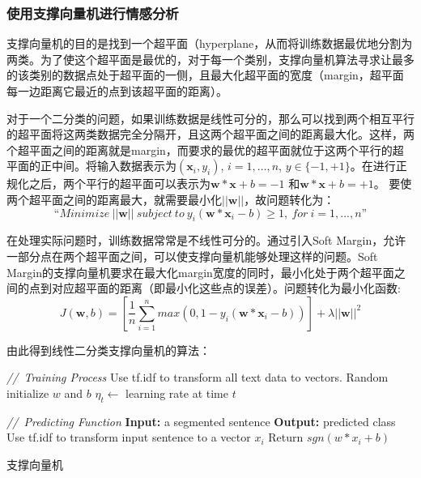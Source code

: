 \subsubsection{使用支撑向量机进行情感分析}
支撑向量机的目的是找到一个超平面（hyperplane，从而将训练数据最优地分割为两类。为了使这个超平面是最优的，对于每一个类别，支撑向量机算法寻求让最多的该类别的数据点处于超平面的一侧，且最大化超平面的宽度（margin，超平面每一边距离它最近的点到该超平面的距离）。

对于一个二分类的问题，如果训练数据是线性可分的，那么可以找到两个相互平行的超平面将这两类数据完全分隔开，且这两个超平面之间的距离最大化。这样，两个超平面之间的距离就是margin，而要求的最优的超平面就位于这两个平行的超平面的正中间。将输入数据表示为$(\textbf{x}_i, y_i)$, $i=1,..., n$, $y \in \{-1,+1\}$。在进行正规化之后，两个平行的超平面可以表示为$\textbf{w}*\textbf{x}+b=-1$ 和$\textbf{w}*\textbf{x}+b=+1$。 要使两个超平面之间的距离最大，就需要最小化$||\textbf{w}||$，故问题转化为：
\begin{equation} \label{eq2.2}
“Minimize\ ||\textbf{w}||\ subject\ to\ y_i(\textbf{w}*\textbf{x}_i-b)\ge 1,\ for\ i=1,...,n”
\end{equation}

在处理实际问题时，训练数据常常是不线性可分的。通过引入Soft Margin，允许一部分点在两个超平面之间，可以使支撑向量机能够处理这样的问题。Soft Margin的支撑向量机要求在最大化margin宽度的同时，最小化处于两个超平面之间的点到对应超平面的距离（即最小化这些点的误差）。问题转化为最小化函数:
\begin{equation} \label{eq2.3}
J(\textbf{w},b)=[\frac{1}{n}\sum_{i=1}^{n}max(0,1-y_i(\textbf{w}*\textbf{x}_i-b))]+\lambda ||\textbf{w}||^2
\end{equation}

由此得到线性二分类支撑向量机的算法：
\begin{algorithm}

\emph{//\ Training Process}\;
Use tf.idf to transform all text data to vectors.\;
Random initialize $w$ and $b$\;
$\eta_t\leftarrow$ learning rate at time $t$\;

\BlankLine
\emph{//\ Predicting Function}\;
\textbf{Input:} a segmented sentence\;
\textbf{Output:} predicted class\;
Use tf.idf to transform input sentence to a vector $x_{i}$\;
Return $sgn(w * x_i + b)$
\caption{支撑向量机}\label{SVM}
\label{alog:algorithm1}
\end{algorithm}\DecMargin{1em}


